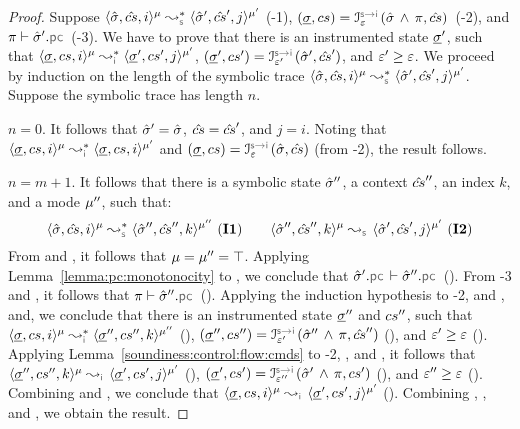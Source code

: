 \begin{proof}

Suppose $\transabssemrule{\sstate, \scs, i}{\sstate', \scs', j}{\mode}{\mode'}{\symbolic}$ (\hyp{1}), 
$(\istate, \cs) = \interpret{\symbinst}{\senv}(\sstate \, \wedge \, \pc, \scs)$~(\hyp{2}), and 
$\pc \vdash \sstate'.\pcsel$ (\hyp{3}). 
We have to prove that there is an instrumented state $\underline{\sigma}'$,
such that $\transabssemrule{\istate, \cs, i}{\istate', \cs', j}{\mode}{\mode'}{\instrumented}$, 
$(\istate', \cs') = \interpret{\symbinst}{\senv'}(\sstate', \scs')$, and $\varepsilon' \geq  \varepsilon$.
We proceed by induction on the length of the symbolic trace 
 $\transabssemrule{\sstate, \scs, i}{\sstate', \scs', j}{\mode}{\mode'}{\symbolic}$. 
Suppose the symbolic trace has length $n$. 
\vspace{6pt}

\noindent {} $n = 0$. It follows that $\hat{\sigma}' = \hat{\sigma}$, 
$\hat{cs} = \hat{cs}'$, and $j = i$. Noting that 
$\transabssemrule{\istate, \cs, i}{\istate, \cs, i}{\mode}{\mode'}{\instrumented}$
and 
$(\istate, \cs) = \interpret{\symbinst}{\senv}(\sstate, \scs)$ (from \hyp{2}), 
the result follows. 
\vspace{6pt}


\noindent {} $n = m + 1$. It follows that there is a symbolic state 
$\hat{\sigma}''$, a context $\hat{cs}''$, an index $k$, and a mode $\mu''$, such that: 
$$
\transabssemrule{\sstate, \scs, i}{\sstate'', \scs'', k}{\mode}{\mode''}{\symbolic} \text{ (\ieq{1})}
\qquad 
\abssemrule{\sstate'', \scs'', k}{\sstate', \scs', j}{\mode}{\mode'}{\symbolic} \text{ (\ieq{2})}
$$
From  and , it follows that $\mu = \mu'' = \top$. 
Applying Lemma~\ref{lemma:pc:monotonocity} to , we conclude that $\sstate'.\pcsel \vdash \sstate''.\pcsel$ (). 
From \hyp{3} and , it follows that $\pc \vdash \sstate''.\pcsel$ (). 
Applying the induction hypothesis to \hyp{2},  and , and, we conclude that 
there is an instrumented state $\underline{\sigma}''$ and $cs''$, such that
$\transabssemrule{\istate, \cs, i}{\istate'', \cs'', k}{\mode}{\mode''}{\instrumented}$ (), 
$(\istate'', \cs'') = \interpret{\symbinst}{\senv'}(\sstate'' \, \wedge \, \pc, \scs'')$ (), and 
$\varepsilon' \geq  \varepsilon$ (). 
Applying Lemma~\ref{soundiness:control:flow:cmds} to \hyp{2}, , and ,
it follows that  
$\abssemrule{\istate'', \cs'', k}{\istate', \cs', j}{\mode}{\mode'}{\instrumented}$ (), 
$(\istate', \cs') = \interpret{\symbinst}{\senv''}(\sstate' \, \wedge \, \pc, \cs')$ (), and 
$\varepsilon'' \geq  \varepsilon$ (). 
Combining  and , we conclude that 
$\abssemrule{\istate, \cs, i}{\istate', \cs', j}{\mode}{\mode'}{\instrumented}$ (). 
Combining , , and , we obtain the result. 
\end{proof}

